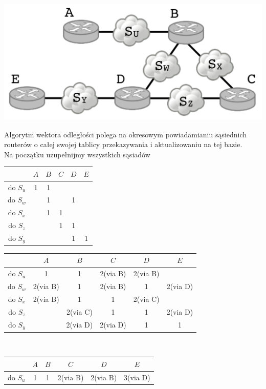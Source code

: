 \documentclass{article}[A4]
\begin{document}
\begin{enumerate}
\begin{center}
	\includegraphics[scale=0.2]{./L01Z06.png}
\end{center}
Algorytm wektora odległości polega na okresowym powiadamianiu sąsiednich routerów o całej swojej tablicy przekazywania i aktualizowaniu na tej bazie.\\
Na początku uzupełnijmy wszystkich sąsiadów
\begin{center}
	\begin{tabular}{c||c|c|c|c|c|} 
	  &$A$&$B$&$C$&$D$&$E$\\
	 \hline \hline
	 do $S_u$&1&1& & & \\ 
	 \hline
	 do $S_w$& &1& &1& \\ 
	 \hline
	 do $S_x$& &1&1& & \\ 
	 \hline
	 do $S_z$& & &1&1& \\ 
	 \hline
	 do $S_y$& & & &1&1\\ 
	 \hline \hline
	\end{tabular}
	\begin{tabular}{c||c|c|c|c|c|} 
	  &$A$&$B$&$C$&$D$&$E$\\
	 \hline \hline
	 do $S_u$&1&1&2(via B)&2(via B)& \\ 
	 \hline
	 do $S_w$&2(via B)&1&2(via B)&1&2(via D)\\ 
	 \hline
	 do $S_x$&2(via B)&1&1&2(via C)& \\ 
	 \hline
	 do $S_z$& &2(via C)&1&1&2(via D)\\ 
	 \hline
	 do $S_y$& &2(via D)&2(via D)&1&1\\ 
	 \hline \hline
	\end{tabular}\\
	\vspace{1em}
	\begin{tabular}{c||c|c|c|c|c|} 
	  &$A$&$B$&$C$&$D$&$E$\\
	 \hline \hline
	 do $S_u$&1&1&2(via B)&2(via B)&3(via D)\\ 

\end{tabular}
\end{center}
\end{enumerate}
\end{document}
